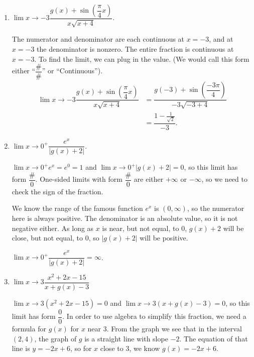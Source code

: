 \documentclass{ximera}
\begin{document}
\begin{problem}
\begin{enumerate}
			\item $\displaystyle \lim{x\to -3} \dfrac{g(x)+\sin\left(\dfrac{\pi}{4}x\right)}{x\sqrt{x+4} }$. \\
\begin{explanation}
			The numerator and denominator are each continuous at $x=-3$, and at $x=-3$ the denominator is nonzero. The entire fraction is continuous at $x=-3$. To find the limit, we can plug in the value. (We would call this form either ``$\dfrac{\#}{\#}$'' or ``Continuous'').
			\begin{align*}
				\displaystyle \lim{x\to -3} \dfrac{g(x)+\sin\left(\dfrac{\pi}{4}x\right)}{x\sqrt{x+4}} &= \dfrac{g(-3)+\sin\left(\dfrac{-3 \pi}{4}\right)}{-3\sqrt{-3+4}} \\
	&=\dfrac{1-\frac{1}{\sqrt{2}}}{-3}. 
			\end{align*}    
		\end{explanation}
			

			\item $\displaystyle \lim{x\to 0^+}  \dfrac{e^x}{\left|g(x)+2\right|}$. \\
\begin{explanation}
			$\displaystyle \lim{x\to 0^+} e^x = e^0 = 1$ and $\displaystyle \lim{x\to 0^+} |g(x)+2| = 0$, so this limit has form $\dfrac{\#}{0}$. One-sided limits with form $\dfrac{\#}{0}$ are either $+\infty$ or $-\infty$, so we need to check the sign of the fraction.
			
			We know the range of the famous function $e^x$ is $(0, \infty)$, so the numerator here is always positive. The denominator is an absolute value, so it is not negative either. As long as $x$ is near, but not equal, to $0$, $g(x)+2$ will be close, but not equal, to $0$, so $|g(x)+2|$ will be positive.
		
		$\displaystyle \lim{x\to 0^+}  \dfrac{e^x}{\left|g(x)+2\right|} = \infty$.	
		\end{explanation}															
			\item	$\displaystyle \lim{x\to 3} \dfrac{x^2+2x-15}{x + g(x) - 3}$
\begin{explanation}
			$\displaystyle \lim{x\to 3} (x^2+2x-15) = 0$ and $\displaystyle \lim{x\to 3} (x + g(x) - 3) = 0$, so this limit has form $\dfrac{0}{0}$. In order to use algebra to simplify this fraction, we need a formula for $g(x)$ for $x$ near $3$. From the graph we see that in the interval $(2, 4)$, the graph of $g$ is a straight line with slope $-2$. The equation of that line is $y = -2x+6$, so for $x$ close to $3$, we know $g(x) = -2x+6$.
			


\end{explanation}
\end{enumerate}
\end{problem}
\end{document}
